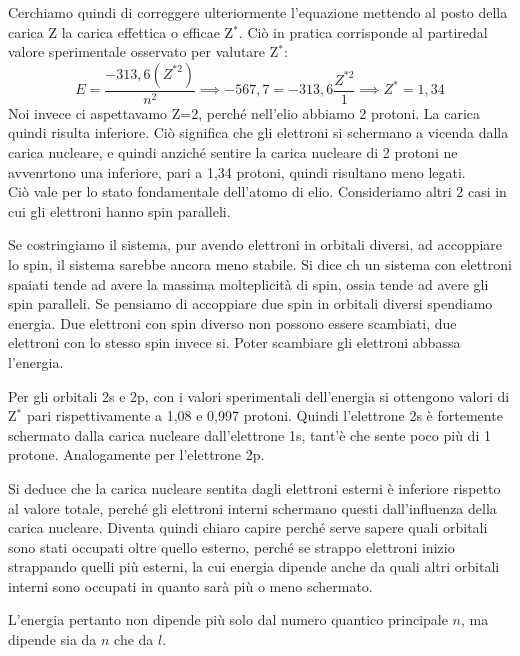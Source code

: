 Cerchiamo quindi di correggere ulteriormente l'equazione mettendo al posto della carica Z la carica effettica o efficae Z$^*$. Ciò in pratica corrisponde al partiredal valore sperimentale osservato per valutare Z$^*$:
$$E=\frac{-313,6(Z^{*2})}{n^2} \implies -567,7=-313,6\frac{Z^{*2}}{1} \implies Z^*=1,34$$
Noi invece ci aspettavamo Z=2, perché nell'elio abbiamo 2 protoni. La carica quindi risulta inferiore. Ciò significa che gli elettroni si schermano a vicenda dalla carica nucleare, e quindi anziché sentire la carica nucleare di 2 protoni ne avvenrtono una inferiore, pari a 1,34 protoni, quindi risultano meno legati.\\

Ciò vale per lo stato fondamentale dell'atomo di elio. Consideriamo altri 2 casi in cui gli elettroni hanno spin paralleli.

Se costringiamo il sistema, pur avendo elettroni in orbitali diversi, ad accoppiare lo spin, il sistema sarebbe ancora meno stabile. Si dice ch un sistema con elettroni spaiati tende ad avere la massima molteplicità di spin, ossia tende ad avere gli spin paralleli. Se pensiamo di accoppiare due spin in orbitali diversi spendiamo energia.
Due elettroni con spin diverso non possono essere scambiati, due elettroni con lo stesso spin invece si. Poter scambiare gli elettroni abbassa l'energia.

Per gli orbitali 2s e 2p, con i valori sperimentali dell'energia si ottengono valori di Z$^*$ pari rispettivamente a 1,08 e 0,997 protoni. Quindi l'elettrone 2s è fortemente schermato dalla carica nucleare dall'elettrone 1s, tant'è che sente poco più di 1 protone. Analogamente per l'elettrone 2p.

Si deduce che la carica nucleare sentita dagli elettroni esterni è inferiore rispetto al valore totale, perché gli elettroni interni schermano questi dall'influenza della carica nucleare. Diventa quindi chiaro capire perché serve sapere quali orbitali sono stati occupati oltre quello esterno, perché se strappo elettroni inizio strappando quelli più esterni, la cui energia dipende anche da quali altri orbitali interni sono occupati in quanto sarà più o meno schermato.

L'energia pertanto non dipende più solo dal numero quantico principale $n$, ma dipende sia da $n$ che da $l$.

